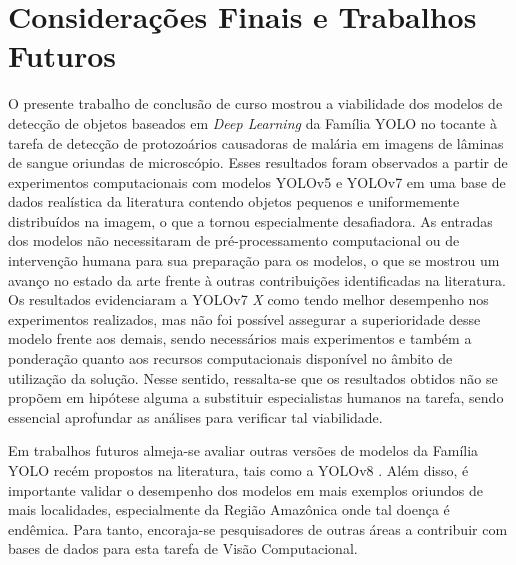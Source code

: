
\chapter{Considerações Finais e Trabalhos Futuros} \label{cap:considera}

O presente trabalho de conclusão de curso mostrou a viabilidade dos modelos de detecção de objetos baseados em \emph{Deep Learning} da Família YOLO no tocante à tarefa de detecção de protozoários causadoras de malária em imagens de lâminas de sangue oriundas de microscópio. Esses resultados foram observados a partir de experimentos computacionais com modelos YOLOv5 e YOLOv7 em uma base de dados realística da literatura contendo objetos pequenos e uniformemente distribuídos na imagem, o que a tornou especialmente desafiadora. As entradas dos modelos não necessitaram de pré-processamento computacional ou de intervenção humana para sua preparação para os modelos, o que se mostrou um avanço no estado da arte frente à outras contribuições identificadas na literatura. Os resultados evidenciaram a YOLOv7 \emph{X} como tendo melhor desempenho nos experimentos realizados, mas não foi possível assegurar a superioridade desse modelo frente aos demais, sendo necessários mais experimentos e também a ponderação quanto aos recursos computacionais disponível no âmbito de utilização da solução. Nesse sentido, ressalta-se que os resultados obtidos não se propõem em hipótese alguma a substituir especialistas humanos na tarefa, sendo essencial aprofundar as análises para verificar tal viabilidade.

Em trabalhos futuros almeja-se avaliar outras versões de modelos da Família YOLO recém propostos na literatura, tais como a YOLOv8 \cite{Jocher:YOLOv8}. Além disso, é importante validar o desempenho dos modelos em mais exemplos oriundos de mais localidades, especialmente da Região Amazônica onde tal doença é endêmica. Para tanto, encoraja-se pesquisadores de outras áreas a contribuir com bases de dados para esta tarefa de Visão Computacional.
